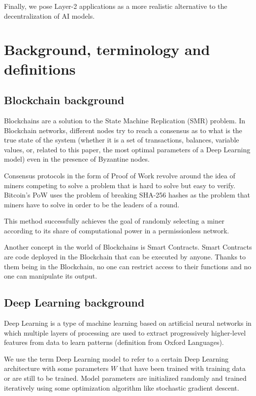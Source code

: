 \documentclass[conference]{IEEEtran}
\begin{document}
Finally, we pose Layer-2 applications as a more realistic alternative to the decentralization of AI models.

\section{Background, terminology and definitions}
\subsection{Blockchain background}
Blockchains are a solution to the State Machine Replication (SMR) problem. In Blockchain networks, different nodes try to reach a consensus as to what is the true state of the system (whether it is a set of transactions, balances, variable values, or, related to this paper, the most optimal parameters of a Deep Learning model) even in the presence of Byzantine nodes.

Consensus protocols in the form of Proof of Work revolve around the idea of miners competing to solve a problem that is hard to solve but easy to verify. Bitcoin's PoW uses the problem of breaking SHA-256 hashes as the problem that miners have to solve in order to be the leaders of a round.

This method successfully achieves the goal of randomly selecting a miner according to its share of computational power in a permissionless network.

Another concept in the world of Blockchains is Smart Contracts. Smart Contracts are code deployed in the Blockchain that can be executed by anyone. Thanks to them being in the Blockchain, no one can restrict access to their functions and no one can manipulate its output.

\subsection{Deep Learning background}
Deep Learning is a type of machine learning based on artificial neural networks in which multiple layers of processing are used to extract progressively higher-level features from data to learn patterns (definition from Oxford Languages).

We use the term Deep Learning model to refer to a certain Deep Learning architecture with some parameters $W$ that have been trained with training data or are still to be trained. Model parameters are initialized randomly and trained iteratively using some optimization algorithm like stochastic gradient descent.
\end{document}
